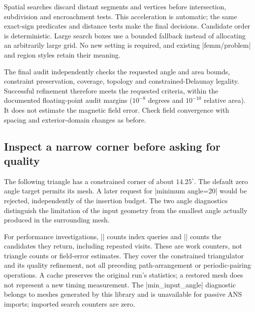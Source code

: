 Spatial searches discard distant segments and vertices before intersection,
subdivision and encroachment tests. This acceleration is automatic; the same
exact-sign predicates and distance tests make the final decisions. Candidate
order is deterministic. Large search boxes use a bounded fallback instead of
allocating an arbitrarily large grid. No new setting is required, and existing
|femm/problem| and region styles retain their meaning.

The final audit independently checks the requested angle and area bounds,
constraint preservation, coverage, topology and constrained-Delaunay legality.
Successful refinement therefore meets the requested criteria, within the
documented floating-point audit margins ($10^{-8}$ degrees and $10^{-10}$
relative area). It does not estimate the magnetic field error. Check field
convergence with spacing and exterior-domain changes as before.

\subsection{Inspect a narrow corner before asking for quality}
The following triangle has a constrained corner of about $14.25^\circ$.
The default zero angle target permits its mesh. A later request for
|minimum angle=20| would be rejected, independently of the insertion budget.
The two angle diagnostics distinguish the limitation of the input geometry
from the smallest angle actually produced in the surrounding mesh.

\begin{codeexample}[width=5.2cm]
\end{codeexample}

For performance investigations, || counts index
queries and || counts the candidates they
return, including repeated visits. These are work counters, not triangle counts
or field-error estimates. They cover the constrained triangulator and its
quality refinement, not all preceding path-arrangement or periodic-pairing
operations. A cache preserves the original run's statistics; a restored mesh
does not represent a new timing measurement. The |min_input_angle| diagnostic
belongs to meshes generated by this library and is unavailable for passive
ANS imports; imported search counters are zero.

